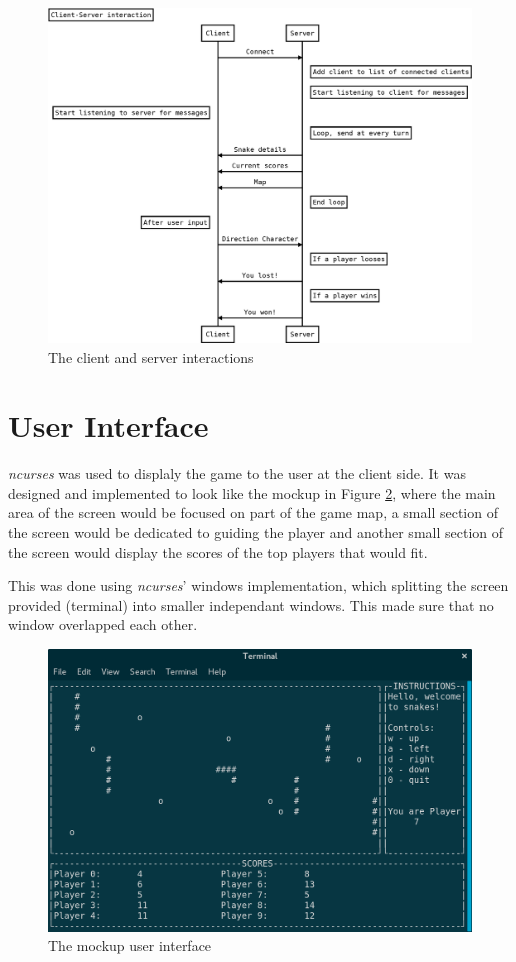 \documentclass[programming,a4paper,12pt,twosided]{myassignment}
\begin{document}
\begin{figure}
  \centering
  \includegraphics[width=\textwidth]{interaction}
  \caption{The client and server interactions}
  \label{fig:interaction}
\end{figure} 

\section{User Interface}
\emph{ncurses} was used to displaly the game to the user at the client side. It was designed and implemented to look like the mockup in Figure \ref{fig:mockup}, where the main area of the screen would be focused on part of the game map, a small section of the screen would be dedicated to guiding the player and another small section of the screen would display the scores of the top players that would fit. 

This was done using \emph{ncurses}' windows implementation, which splitting the screen provided (terminal) into smaller independant windows. This made sure that no window overlapped each other.

\begin{figure}
  \centering
  \includegraphics[width=\textwidth]{terminal}
  \caption{The mockup user interface}
  \label{fig:mockup}
\end{figure} 
\end{document}
